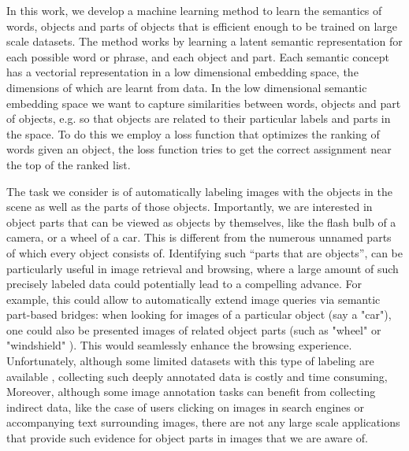 In this work, we develop a machine learning method to learn the
semantics of words, objects and parts of objects that is efficient
enough to be trained on large scale datasets.  The method works by
learning a latent semantic representation for each possible word or
phrase, and each object and part. Each semantic concept has a
vectorial representation in a low dimensional embedding space, the
dimensions of which are learnt from data.
In the low dimensional semantic embedding space we want to capture
similarities between words, objects and part of objects, e.g. so that
objects are related to their particular labels and parts in the space.
To do this we employ a loss function that optimizes the ranking of
words given an object, the loss function tries to get the correct
assignment near the top of the ranked list.

The task we consider is of automatically labeling images with the
objects in the scene as well as the parts of those objects.
Importantly, we are interested in object parts that can be viewed as
objects by themselves, like the flash bulb of a camera, or a wheel of a car.
This is different from the numerous unnamed parts of which every object
consists of. Identifying such ``parts that are objects'', can be
particularly useful in image retrieval and browsing, where a large amount of 
such precisely labeled data could potentially lead
to a compelling advance.
%
%
%
%
%
%
For example, this could allow to automatically extend image queries 
via semantic part-based bridges: when looking for images of a particular 
object (say a "car"), one could also be presented images of related object parts 
(such as "wheel" or "windshield" ). This would seamlessly enhance the browsing experience.
%
Unfortunately, although some limited datasets with this type of
labeling are available \cite{Yao:2007, labelme}, collecting such
deeply annotated data is costly and time consuming,
%
Moreover, although some image annotation tasks can benefit from
collecting indirect data, like the case of users clicking on images in
search engines or accompanying text surrounding images, there are not
any large scale applications that provide such evidence for object
parts in images that we are aware of.


